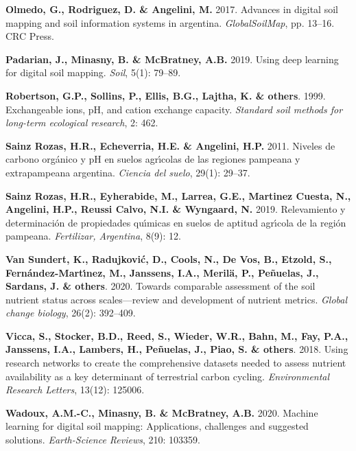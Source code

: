 \documentclass[
  10pt,
  b5paper,
  oneside]{book}
\newlength{\cslhangindent}
\newlength{\cslentryspacingunit} %
\newenvironment{CSLReferences}[2] %
 {%
  \setlength{\parindent}{0pt}
  \ifodd #1
  \let\oldpar\par
  \def\par{\hangindent=\cslhangindent\oldpar}
  \fi
  \setlength{\parskip}{#2\cslentryspacingunit}
 }%
 {}
\begin{document}
\begin{CSLReferences}{0}{0}
\leavevmode{}%
\textbf{Olmedo, G., Rodriguez, D. \& Angelini, M.} 2017. Advances in digital soil mapping and soil information systems in argentina. \emph{GlobalSoilMap}, pp. 13--16. CRC Press.

\leavevmode{}%
\textbf{Padarian, J., Minasny, B. \& McBratney, A.B.} 2019. Using deep learning for digital soil mapping. \emph{Soil}, 5(1): 79--89.

\leavevmode{}%
\textbf{Robertson, G.P., Sollins, P., Ellis, B.G., Lajtha, K. \& others}. 1999. Exchangeable ions, pH, and cation exchange capacity. \emph{Standard soil methods for long-term ecological research}, 2: 462.

\leavevmode{}%
\textbf{Sainz Rozas, H.R., Echeverria, H.E. \& Angelini, H.P.} 2011. Niveles de carbono org{á}nico y pH en suelos agr{ı́}colas de las regiones pampeana y extrapampeana argentina. \emph{Ciencia del suelo}, 29(1): 29--37.

\leavevmode{}%
\textbf{Sainz Rozas, H.R., Eyherabide, M., Larrea, G.E., Martinez Cuesta, N., Angelini, H.P., Reussi Calvo, N.I. \& Wyngaard, N.} 2019. Relevamiento y determinaci{ó}n de propiedades qu{ı́}micas en suelos de aptitud agr{ı́}cola de la regi{ó}n pampeana. \emph{Fertilizar, Argentina}, 8(9): 12.

\leavevmode{}%
\textbf{Van Sundert, K., Radujković, D., Cools, N., De Vos, B., Etzold, S., Fernández-Martı́nez, M., Janssens, I.A., Merilä, P., Peñuelas, J., Sardans, J. \& others}. 2020. Towards comparable assessment of the soil nutrient status across scales---review and development of nutrient metrics. \emph{Global change biology}, 26(2): 392--409.

\leavevmode{}%
\textbf{Vicca, S., Stocker, B.D., Reed, S., Wieder, W.R., Bahn, M., Fay, P.A., Janssens, I.A., Lambers, H., Peñuelas, J., Piao, S. \& others}. 2018. Using research networks to create the comprehensive datasets needed to assess nutrient availability as a key determinant of terrestrial carbon cycling. \emph{Environmental Research Letters}, 13(12): 125006.

\leavevmode{}%
\textbf{Wadoux, A.M.-C., Minasny, B. \& McBratney, A.B.} 2020. Machine learning for digital soil mapping: Applications, challenges and suggested solutions. \emph{Earth-Science Reviews}, 210: 103359.


\end{CSLReferences}
\end{document}
